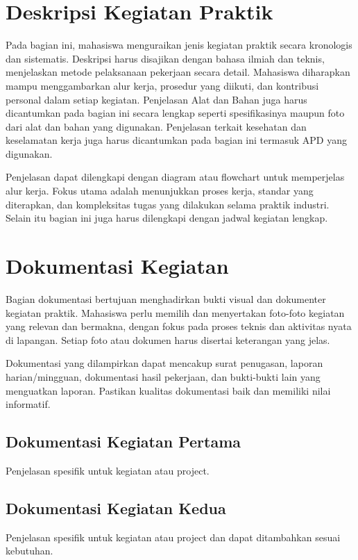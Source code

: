 \section{Deskripsi Kegiatan Praktik}
Pada bagian ini, mahasiswa menguraikan jenis kegiatan praktik secara kronologis dan sistematis. Deskripsi harus disajikan dengan bahasa ilmiah dan teknis, menjelaskan metode pelaksanaan pekerjaan secara detail. Mahasiswa diharapkan mampu menggambarkan alur kerja, prosedur yang diikuti, dan kontribusi personal dalam setiap kegiatan. Penjelasan Alat dan Bahan juga harus dicantumkan pada bagian ini secara lengkap seperti spesifikasinya maupun foto dari alat dan bahan yang digunakan. Penjelasan terkait kesehatan dan keselamatan kerja juga harus dicantumkan pada bagian ini termasuk APD yang digunakan.

Penjelasan dapat dilengkapi dengan diagram atau flowchart untuk memperjelas alur kerja. Fokus utama adalah menunjukkan proses kerja, standar yang diterapkan, dan kompleksitas tugas yang dilakukan selama praktik industri. Selain itu bagian ini juga harus dilengkapi dengan jadwal kegiatan lengkap.

\section{Dokumentasi Kegiatan}
Bagian dokumentasi bertujuan menghadirkan bukti visual dan dokumenter kegiatan praktik. Mahasiswa perlu memilih dan menyertakan foto-foto kegiatan yang relevan dan bermakna, dengan fokus pada proses teknis dan aktivitas nyata di lapangan. Setiap foto atau dokumen harus disertai keterangan yang jelas.

Dokumentasi yang dilampirkan dapat mencakup surat penugasan, laporan harian/mingguan, dokumentasi hasil pekerjaan, dan bukti-bukti lain yang menguatkan laporan. Pastikan kualitas dokumentasi baik dan memiliki nilai informatif.

\subsection{Dokumentasi Kegiatan Pertama}
Penjelasan spesifik untuk kegiatan atau project.

\subsection{Dokumentasi Kegiatan Kedua}
Penjelasan spesifik untuk kegiatan atau project dan dapat ditambahkan sesuai kebutuhan.

